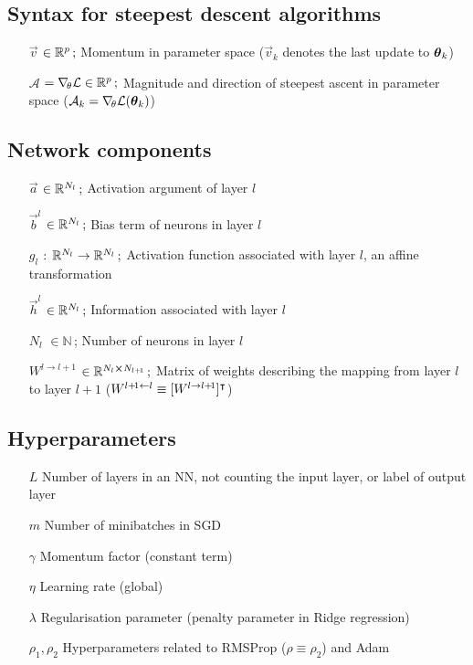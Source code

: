 \subsection*{Syntax for steepest descent algorithms}
\begin{itemize}
    \item[$\vec{v}$] $\in\RR[p]\, ;$ Momentum in parameter space ($\vec{v}_k$ denotes the last update to $\svec{\theta}_k$)
    \item[$\mathcal{A}$] $=\nabla_{\! \theta} \mathcal{L} \in\RR[p]\, ;$ Magnitude and direction of steepest ascent in parameter space ($\mathcal{A}_k = \nabla_{\! \theta} \mathcal{L}(\svec{\theta}_k)$)
\end{itemize}

\subsection*{Network components}
\begin{itemize}[leftmargin=3.8em]
    \item[$\vec{a}$] $\in\RR[N_l]\, ;$ Activation argument of layer $l$
    \item[$\vec{b}^l$] $\in \RR[N_l]\,;$ Bias term of neurons in layer $l$
    \item[$g_l$] $:\,\RR[N_l] \to\RR[N_{l}]\,;$ Activation function associated with layer $l$, an affine transformation
    \item[$\vec{h}^l$] $\in\RR[N_l]\, ;$ Information associated with layer $l$ 
    \item[$N_l$] $\in \mathbb{N}$\,; Number of neurons in layer $l$
    \item[$W^{l\to l+\! 1}$] $\in \RR[N_l \cross N_{l+\! 1}]\,;$ Matrix of weights describing the mapping from layer $l$ to layer $l+1$ ($W^{l+\! 1 \leftarrow l} \equiv [W^{l\to l+\! 1}]\TT$)
\end{itemize}

\subsection*{Hyperparameters}
\begin{itemize}[leftmargin=2.8em]
    \item[$L$] Number of layers in an NN, not counting the input layer, or label of output layer 
    \item[$m$] Number of minibatches in SGD
    \item[$\gamma$] Momentum factor (constant term)
    \item[$\eta$] Learning rate (global)
    \item[$\lambda$] Regularisation parameter (penalty parameter in Ridge regression)
    \item[$\rho_1, \rho_2$] Hyperparameters related to RMSProp ($\rho \equiv \rho_2$) and Adam
\end{itemize}

